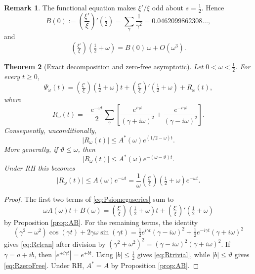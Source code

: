 \documentclass[11pt,reqno]{amsart}
\theoremstyle{plain}
\newtheorem{theorem}{Theorem}[section]
\theoremstyle{definition}
\newtheorem{remark}[theorem]{Remark}
\newcommand{\lxi}[1]{\left(\tfrac{\xi'}{\xi}\right)\!#1}
\begin{document}
\begin{remark}\label{rem:B0}
The functional equation makes $\xi'/\xi$ odd about $s=\tfrac12$.  Hence
\begin{equation}\label{eq:B0}
 B(0):=\left(\frac{\xi'}{\xi}\right)'\!\left(\tfrac12\right)
 =\sum_\gamma\frac1{\gamma^2}
 =0.0462099862308\ldots,
\end{equation}
and
\begin{equation}\label{eq:slopeSmallOmega}
 \lxi{\left(\tfrac12+\omega\right)}=B(0)\,\omega+O(\omega^3).
\end{equation}
\end{remark}

\begin{theorem}[Exact decomposition and zero-free asymptotic]\label{thm:asym}
Let $0<\omega<\tfrac12$.  For every $t\ge0$,
\begin{equation}\label{eq:mainDecomp}
 \Psi_\omega(t)=\lxi{\left(\tfrac12+\omega\right)}t
 +\lxi{'\left(\tfrac12+\omega\right)}+R_\omega(t),
\end{equation}
where
\begin{equation}\label{eq:Rclean}
 R_\omega(t)=-\frac{e^{-\omega t}}2\sum_\gamma
 \left[
 \frac{e^{i\gamma t}}{(\gamma+i\omega)^2}
 +\frac{e^{-i\gamma t}}{(\gamma-i\omega)^2}
 \right].
\end{equation}
Consequently, unconditionally,
\begin{equation}\label{eq:Rtrivial}
 |R_\omega(t)|\le A^*(\omega)e^{(1/2-\omega)t}.
\end{equation}
More generally, if $\vartheta\le\omega$, then
\begin{equation}\label{eq:RzeroFree}
 |R_\omega(t)|\le A^*(\omega)e^{-(\omega-\vartheta)t}.
\end{equation}
Under RH this becomes
\begin{equation}\label{eq:RRH}
 |R_\omega(t)|\le A(\omega)e^{-\omega t}
 =\frac1\omega\lxi{\left(\tfrac12+\omega\right)}e^{-\omega t}.
\end{equation}
\end{theorem}

\begin{proof}
The first two terms of \eqref{eq:Psiomegaseries} sum to
\[
 \omega A(\omega)t+B(\omega)
 =\lxi{\left(\tfrac12+\omega\right)}t
 +\lxi{'\left(\tfrac12+\omega\right)}
\]
by Proposition \ref{prop:AB}.  For the remaining terms, the identity
\[
 (\gamma^2-\omega^2)\cos(\gamma t)+2\gamma\omega\sin(\gamma t)
 =\tfrac12e^{i\gamma t}(\gamma-i\omega)^2
 +\tfrac12e^{-i\gamma t}(\gamma+i\omega)^2
\]
gives \eqref{eq:Rclean} after division by
$(\gamma^2+\omega^2)^2=(\gamma-i\omega)^2(\gamma+i\omega)^2$.
If $\gamma=a+ib$, then $|e^{\pm i\gamma t}|=e^{\mp bt}$.  Using $|b|\le\tfrac12$ gives
\eqref{eq:Rtrivial}, while $|b|\le\vartheta$ gives \eqref{eq:RzeroFree}.  Under RH,
$A^*=A$ by Proposition \ref{prop:AB}.
\end{proof}
\end{document}

